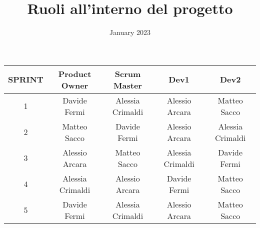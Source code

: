 \documentclass{article}
\title{Ruoli all'interno del progetto}
\date{January 2023}
\begin{document}
    \maketitle

    \begin{center}
        \begin{tabular}{ |c|c|c|c|c| }
            \hline
            SPRINT & Product Owner    & Scrum Master     & Dev1             & Dev2             \\
            \hline
            1      & Davide Fermi     & Alessia Crimaldi & Alessio Arcara   & Matteo Sacco     \\
            \hline
            2      & Matteo Sacco     & Davide Fermi     & Alessio Arcara   & Alessia Crimaldi \\
            \hline
            3      & Alessio Arcara   & Matteo Sacco     & Alessia Crimaldi & Davide Fermi     \\
            \hline
            4      & Alessia Crimaldi & Alessio Arcara   & Davide Fermi     & Matteo Sacco     \\
            \hline
            5      & Davide Fermi     & Alessia Crimaldi & Alessio Arcara   & Matteo Sacco     \\
            \hline
        \end{tabular}
    \end{center}
\end{document}
